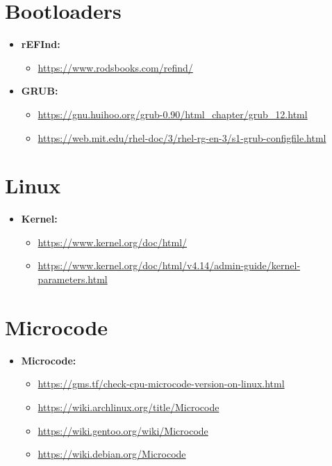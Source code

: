 \documentclass[10pt, a4paper, onecolumn, oneside, titlepage, openany]{book}
\begin{document}
\section{Bootloaders}
\begin{itemize}
    \item \textbf{rEFInd:}
    \begin{itemize}
        \item \url{https://www.rodsbooks.com/refind/}
    \end{itemize}
    \item \textbf{GRUB:}
    \begin{itemize}
        \item \url{https://gnu.huihoo.org/grub-0.90/html_chapter/grub_12.html}
        \item \url{https://web.mit.edu/rhel-doc/3/rhel-rg-en-3/s1-grub-configfile.html}
    \end{itemize}
\end{itemize}

\section{Linux}
\begin{itemize}
    \item \textbf{Kernel:}
    \begin{itemize}
        \item \url{https://www.kernel.org/doc/html/}
        \item \url{https://www.kernel.org/doc/html/v4.14/admin-guide/kernel-parameters.html}
    \end{itemize}
\end{itemize}

\section{Microcode}
\begin{itemize}
    \item \textbf{Microcode:}
    \begin{itemize}
        \item \url{https://gms.tf/check-cpu-microcode-version-on-linux.html}
        \item \url{https://wiki.archlinux.org/title/Microcode}
        \item \url{https://wiki.gentoo.org/wiki/Microcode}
        \item \url{https://wiki.debian.org/Microcode}
    \end{itemize}
\end{itemize}
\end{document}
